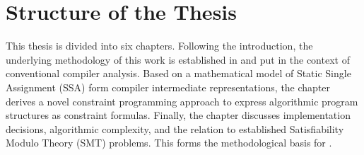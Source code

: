 






\pagebreak

\section{Structure of the Thesis}

    This thesis is divided into six chapters.
    Following the introduction, the underlying methodology of this work is
    established in {\bf{}} and put in the context of
    conventional compiler analysis.
    Based on a mathematical model of Static Single Assignment (SSA) form
    compiler intermediate representations, the chapter derives a novel
    constraint programming approach to express algorithmic program
    structures as constraint formulas.
    Finally, the chapter discusses implementation decisions,
    algorithmic complexity, and the relation to established Satisfiability
    Modulo Theory (SMT) problems.
    This forms the methodological basis for
    {\bf{}}.

